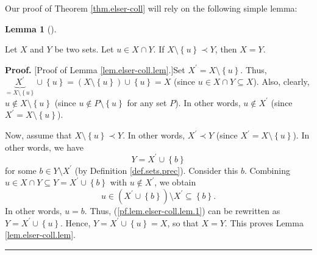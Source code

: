 \documentclass[numbers=enddot,12pt,final,onecolumn]{scrartcl}%
\theoremstyle{definition}
\newtheorem{lem}[theo]{Lemma}
\newenvironment{lemma}[1][]
{\begin{lem}[#1]\begin{leftbar}}
{\end{leftbar}\end{lem}}
\newenvironment{proof}[1][Proof]{\noindent\textbf{#1.} }{\ \rule{0.5em}{0.5em}}
\begin{document}
Our proof of Theorem \ref{thm.elser-coll} will rely on the following simple lemma:

\begin{lemma}
\label{lem.elser-coll.lem}Let $X$ and $Y$ be two sets. Let $u\in X\cap Y$. If
$X\setminus\left\{  u\right\}  \prec Y$, then $X=Y$.
\end{lemma}

\begin{proof}
[Proof of Lemma \ref{lem.elser-coll.lem}.]Set $X^{\prime}=X\setminus\left\{
u\right\}  $. Thus, $\underbrace{X^{\prime}}_{=X\setminus\left\{  u\right\}
}\cup\left\{  u\right\}  =\left(  X\setminus\left\{  u\right\}  \right)
\cup\left\{  u\right\}  =X$ (since $u\in X\cap Y\subseteq X$). Also, clearly,
$u\notin X\setminus\left\{  u\right\}  $ (since $u\notin P\setminus\left\{
u\right\}  $ for any set $P$). In other words, $u\notin X^{\prime}$ (since
$X^{\prime}=X\setminus\left\{  u\right\}  $).

Now, assume that $X\setminus\left\{  u\right\}  \prec Y$. In other words,
$X^{\prime}\prec Y$ (since $X^{\prime}=X\setminus\left\{  u\right\}  $). In
other words, we have
\begin{equation}
Y=X^{\prime}\cup\left\{  b\right\}  \label{pf.lem.elser-coll.lem.1}%
\end{equation}
for some $b\in Y\setminus X^{\prime}$ (by Definition \ref{def.sets.prec}).
Consider this $b$. Combining $u\in X\cap Y\subseteq Y=X^{\prime}\cup\left\{
b\right\}  $ with $u\notin X^{\prime}$, we obtain%
\[
u\in\left(  X^{\prime}\cup\left\{  b\right\}  \right)  \setminus X^{\prime
}\subseteq\left\{  b\right\}  .
\]
In other words, $u=b$. Thus, (\ref{pf.lem.elser-coll.lem.1}) can be rewritten
as $Y=X^{\prime}\cup\left\{  u\right\}  $. Hence, $Y=X^{\prime}\cup\left\{
u\right\}  =X$, so that $X=Y$. This proves Lemma \ref{lem.elser-coll.lem}.
\end{proof}
\end{document}
